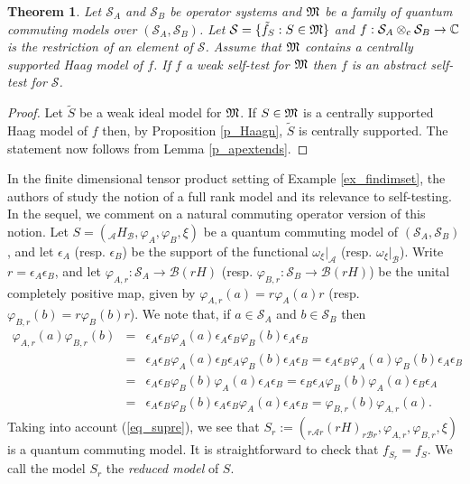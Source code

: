 \documentclass[11pt]{amsart}
\newtheorem{theorem}{Theorem}[section]
\theoremstyle{definition}
\newcommand\nph{\varphi}
\newcommand{\cl}[1]{\mathcal{#1}}
\newcommand{\bb}[1]{\mathbb{#1}}
\providecommand{\wt}[1]{\widetilde{#1}}
\begin{document}
\begin{theorem}\label{th_stisabs}
Let $\cl S_A$ and $\cl S_B$ be operator systems and 
$\frak{M}$ be a family of quantum commuting models over $(\cl S_A,\cl S_B)$. 
Let $\cl S = \{\tilde{f}_S : S\in \frak{M}\}$ and 
$f : \cl S_A\otimes_{\rm c} \cl S_B\to \bb{C}$ 
is the restriction of an element of $\cl S$.
Assume that $\frak{M}$ contains a centrally supported Haag model of $f$.
If $f$ a weak self-test for $\frak{M}$ then $f$ is an abstract self-test for 
$\cl S$. 
\end{theorem}

\begin{proof}
Let $\wt{S}$ be a weak ideal model for $\frak M$. 
If $S \in \frak{M}$ is a centrally supported Haag model of $f$ then, 
by Proposition \ref{p_Haagn}, $\wt{S}$ is centrally supported. The statement now follows from Lemma \ref{p_apextends}.
\end{proof}

In the finite dimensional tensor product setting of Example \ref{ex_findimset}, 
the authors of \cite{pszz} study the notion of a full rank model and 
its relevance to self-testing. In the sequel, we 
comment on a natural commuting operator version of this notion. 
Let 
$S = (_{\cl A}H_{\cl B}, \varphi_A, \varphi_B, \xi)$ be a quantum commuting model of 
$(\cl S_A,\cl S_B)$, and let $\epsilon_A$ (resp. $\epsilon_B$) be the support of 
the functional $\omega_{\xi}|_{\cl A}$ (resp. $\omega_{\xi}|_{\cl B}$). 
Write $r = \epsilon_A\epsilon_B$, and let 
$\nph_{A,r} : \cl S_A\to \cl B(rH)$ (resp. $\nph_{B,r} : \cl S_B\to \cl B(rH)$)
be the unital completely positive map, given by 
$\nph_{A,r}(a) = r\nph_A(a)r$ (resp. $\nph_{B,r}(b) = r\nph_B(b)r$).
We note that, if
$a\in \cl S_A$ and $b\in \cl S_B$ then 
\begin{eqnarray*}
\nph_{A,r}(a)\nph_{B,r}(b) 
& = & 
\epsilon_A\epsilon_B\nph_A(a) \epsilon_A\epsilon_B \nph_B(b)\epsilon_A\epsilon_B\\
& = & 
\epsilon_A\epsilon_B\nph_A(a) \epsilon_B\epsilon_A \nph_B(b)\epsilon_A\epsilon_B
= 
\epsilon_A\epsilon_B\nph_A(a) \nph_B(b)\epsilon_A\epsilon_B\\
& = & 
\epsilon_A\epsilon_B \nph_B(b)\nph_A(a) \epsilon_A\epsilon_B
= 
\epsilon_B \epsilon_A\nph_B(b)\nph_A(a) \epsilon_B\epsilon_A\\
& = & 
\epsilon_A \epsilon_B\nph_B(b)\epsilon_A \epsilon_B\nph_A(a) \epsilon_A\epsilon_B
= 
\nph_{B,r}(b)\nph_{A,r}(a).
\end{eqnarray*}
Taking into account (\ref{eq_supre}), we see that 
$S_r := (_{r\cl A r}(rH)_{r\cl B r}, \varphi_{A,r}, \varphi_{B,r}, \xi)$
is a quantum commuting model. It is straightforward to check that 
$f_{S_r} = f_S$. We call the model $S_r$ the \emph{reduced model} of $S$.
\end{document}
